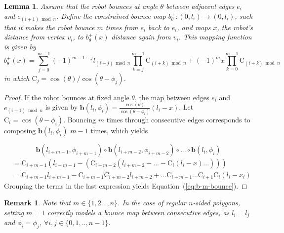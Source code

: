 \documentclass[10pt,a4paper]{article}
\newtheorem{remark}{\bf Remark}
\newtheorem{lemma}{\bf Lemma}
\begin{document}
\begin{lemma} \label{Lemma:convexPolMap}
Assume that the robot bounces at angle $\theta$ between adjacent edges $e_i$ and $e_{(i+1)\bmod n}$. Define the constrained bounce map $b^+_{\theta} : (0, l_i) \to (0, l_i)$, such that it makes the robot bounce $m$ times from $e_i$ back to $e_i$, and maps $x$, the robot's distance from vertex $v_i$, to $b^+_{\theta}(x)$ distance again from $v_i$. This mapping function is given by
\begin{equation} \label{eq:b-m-bounce}
b^+_{\theta}(x) = \sum_{j=0}^{m-1}(-1)^{m-1-j} l_{(i+j)\bmod n} \prod_{k=j}^{m-1} \mathrm{C}_{(i+k)\bmod n} + (-1)^{m}x \prod_{k=0}^{m-1} \mathrm{C}_{(i+k)\bmod n}
\end{equation}
in which $\mathrm{C}_{j}=\cos(\theta) / \cos(\theta - \phi_j)$.
\end{lemma}
\begin{proof}
If the robot bounces at fixed angle $\theta$, the map between edges $e_i$ and $e_{(i+1)\bmod n}$ is given by $\mathrm{\textbf{b}}(l_i,\phi_i) = \frac{ \cos(\theta)}{\cos( \theta - \phi_i)} (l_i - x)$. Let $\mathrm{C}_{i} = \cos( \theta - \phi_i)$. Bouncing $m$ times through consecutive edges corresponds to composing $\mathrm{\textbf{b}}(l_i,\phi_i)$ $m-1$ times, which yields

\begin{equation*}
\mathrm{\textbf{b}}(l_{i+m-1},\phi_{i+m-1}) \circ \mathrm{\textbf{b}}(l_{i+m-2},\phi_{i+m-2}) \circ ... \circ \mathrm{\textbf{b}}(l_i,\phi_i) 
\end{equation*}
\begin{align*}
&= \mathrm{C}_{i+m-1}(l_{i+m-1} - (\mathrm{C}_{i+m-2} (l_{i+m-2} - ... -  \mathrm{C}_i(l_i - x)...))) \\
&= \mathrm{C}_{i+m-1} l_{i+m-1} - \mathrm{C}_{i+m-1} \mathrm{C}_{i+m-2} l_{i+m-2} + ...  \mathrm{C}_{i+m-1} ... \mathrm{C}_{i+1} \mathrm{C}_{i} (l_i - x_i) 
\end{align*}
Grouping the terms in the last expression yields Equation~(\ref{eq:b-m-bounce}).  

\end{proof}


\begin{remark} \label{rm1}
Note that $m \in \{1,2...,n\}$. In the case of regular $n$-sided polygons, setting $m=1$ correctly models a bounce map between consecutive edges, as $l_i=l_j$ and $\phi_i=\phi_j$, $\forall i,j \in \{0,1,..,n-1\} $.   
\end{remark}
\end{document}
